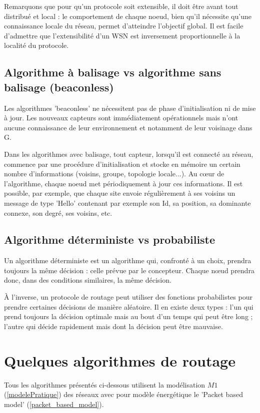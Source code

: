 Remarquons que pour qu'un protocole soit extensible, il doit être avant tout distribué et local :  le comportement de chaque noeud, bien qu'il nécessite qu'une connaissance locale du réseau, permet d'atteindre l'objectif global. Il est facile d'admettre que l'extensibilité d'un WSN est inversement proportionnelle à la localité du protocole.



\subsection{Algorithme à balisage vs algorithme sans balisage (beaconless)}
Les algorithmes 'beaconless' ne nécessitent pas de phase d'initialisation ni de mise à jour. Les nouveaux capteurs sont immédiatement opérationnels mais n'ont aucune connaissance de leur environnement et notamment de leur voisinage dans G. 

Dans les algorithmes avec balisage, tout capteur, lorsqu'il est connecté au réseau, commence par une procédure d'initialisation et stocke en mémoire un certain nombre d'informations (voisins, groupe, topologie locale...). Au cœur de l'algorithme, chaque noeud met périodiquement à jour ces informations. Il est possible, par exemple, que chaque site envoie régulièrement à ses voisins un message de type
'Hello' contenant par exemple son Id, sa position, sa dominante connexe, son degré, ses voisins, etc.



\subsection{Algorithme déterministe vs probabiliste}
Un algorithme déterministe est un algorithme qui, confronté à un choix, prendra toujours la même décision : celle prévue par le concepteur. Chaque nœud prendra donc, dans des conditions similaires, la même décision.

À l'inverse, un protocole de routage peut utiliser des fonctions probabilistes pour prendre certaines décisions de manière aléatoire. Il en existe deux types : l'un qui prend toujours la décision optimale mais au bout d'un temps qui peut être long ; l'autre qui décide rapidement mais dont la décision peut être mauvaise.



\section{Quelques algorithmes de routage}
Tous les algorithmes présentés ci-dessous utilisent la modélisation $M1$ (\ref{modelePratique}) des réseaux avec pour modèle énergétique le 'Packet based model' (\ref{packet_based_model}).


